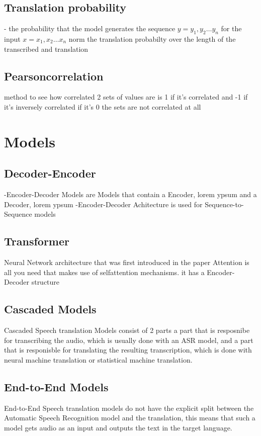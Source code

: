 \subsection{Translation probability}
- the probability that the model generates the sequence $y = y_1, y_2 \dots y_n$ for the input $x=x_1, x_2 \dots x_n$
norm the translation probabilty over the length of the transcribed and translation 
\subsection{Pearsoncorrelation}
method to see how correlated 2 sets of values are
is 1 if it's correlated and -1 if it's inversely correlated 
if it's 0 the sets are not correlated at all

\section{Models}
\subsection{Decoder-Encoder}
-Encoder-Decoder Models are Models that contain a Encoder, lorem ypsum 
and a Decoder, lorem ypsum
-Encoder-Decoder Achitecture is used for Sequence-to-Sequence models

\subsection{Transformer}
Neural Network architecture that was first introduced in the paper Attention is all you need \cite{vaswani2023attentionneed} that makes use of selfattention mechanisms. it has a Encoder-Decoder structure

\subsection{ Cascaded Models}
Cascaded Speech translation Models consist of 2 parts a part that is resposnibe for transcribing the audio, which is usually done with an ASR model, and a part that is responisble for translating the resulting transcription, which is done with neural machine translation or statistical machine translation. 
\subsection{End-to-End Models}
End-to-End Speech translation models do not have the explicit split between the Automatic Speech Recognition model and the translation, this means that such a model gets audio as an input and outputs the text in the target language. 
